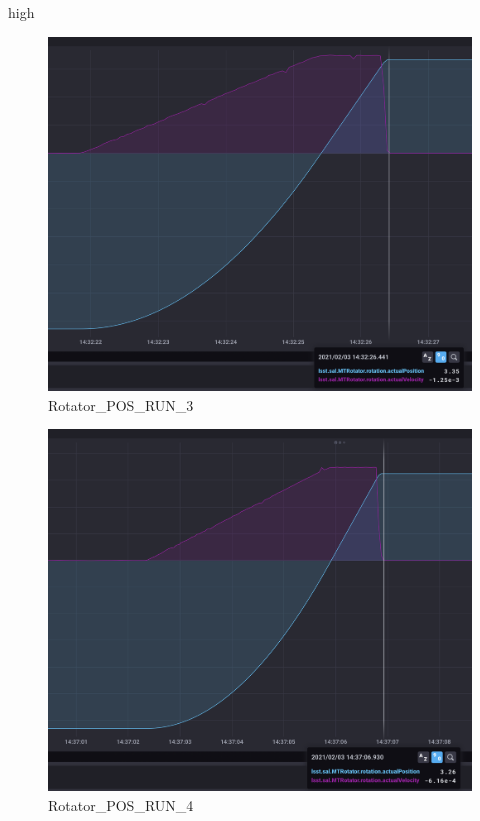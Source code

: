 high\documentclass[SE,lsstdraft,authoryear,toc]{lsstdoc}
\begin{document}
\begin{figure}[h!]
  \includegraphics[width=\linewidth]{media/Rotator_design_speed_pos_test3.png}
  \caption{Rotator\_POS\_RUN\_3}
  \label{fig:Rotator_POS_RUN_3}
\end{figure}
\begin{figure}[h!]
  \includegraphics[width=\linewidth]{media/Rotator_design_speed_pos_test4.png}
  \caption{Rotator\_POS\_RUN\_4}
  \label{fig:Rotator_POS_RUN_4}
\end{figure}
\end{document}
